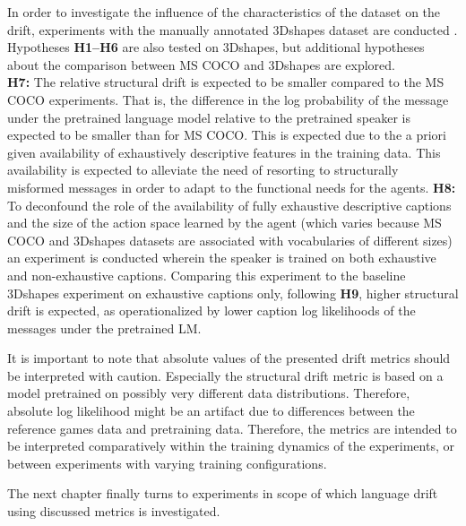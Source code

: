 In order to investigate the influence of the characteristics of the dataset on the drift, experiments with the manually annotated 3Dshapes dataset are conducted \parencite{burgess20183d}. Hypotheses \textbf{H1--H6} are also tested on 3Dshapes, but additional hypotheses about the comparison between MS COCO and 3Dshapes are explored. \\
\newline
\textbf{H7:} The relative structural drift is expected to be smaller compared to the MS COCO experiments. That is, the difference in the log probability of the message under the pretrained language model relative to the pretrained speaker is expected to be smaller than for MS COCO. This is expected due to the a priori given availability of exhaustively descriptive features in the training data. This availability is expected to alleviate the need of resorting to structurally misformed messages in order to adapt to the functional needs for the agents. \newline
\textbf{H8:} To deconfound the role of the availability of fully exhaustive descriptive captions and the size of the action space learned by the agent (which varies because MS COCO and 3Dshapes datasets are associated with vocabularies of different sizes) an experiment is conducted wherein the speaker is trained on both exhaustive and non-exhaustive captions. Comparing this experiment to the baseline 3Dshapes experiment on exhaustive captions only, following \textbf{H9}, higher structural drift is expected, as operationalized by lower caption log likelihoods of the messages under the pretrained LM.\newline

It is important to note that absolute values of the presented drift metrics should be interpreted with caution. Especially the structural drift metric is based on a model pretrained on possibly very different data distributions. Therefore, absolute log likelihood might be an artifact due to differences between the reference games data and pretraining data. Therefore, the metrics are intended to be interpreted comparatively within the training dynamics of the experiments, or between experiments with varying training configurations.

The next chapter finally turns to experiments in scope of which language drift using discussed metrics is investigated. 
